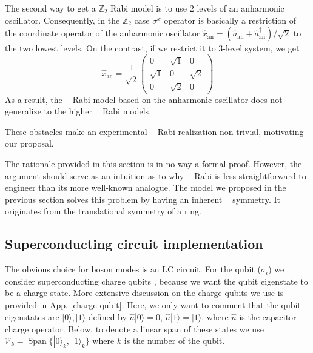 \documentclass[reprint, aps, prx, amsmath, amssymb, longbibliography, superscriptaddress]{revtex4-2}
\DeclareMathOperator{\Zn}{\mathbb{Z}_n}
\DeclareMathOperator{\Zthree}{\mathbb{Z}_3}
\DeclareMathOperator{\Ztwo}{\mathbb{Z}_2}
\begin{document}
The second way to get a $\mathbb{Z}_2$ Rabi model is to use $2$ levels of an anharmonic oscillator. Consequently, in the $\mathbb{Z}_2$ case $\sigma^x$ operator is basically a restriction of the coordinate operator  of the anharmonic oscillator $ \hat x_{\text{an}} = (\hat a_{\text{an}} + \hat a_{\text{an}}^{\dagger})/\sqrt{2} $ to the two lowest levels. On the contrast, if we restrict it to 3-level system, we get
\begin{equation}
    \hat x_{\text{an}} = \frac{1}{\sqrt{2}}\begin{pmatrix} 0 & \sqrt{1} & 0 \\ \sqrt{1} & 0 & \sqrt{2} \\ 0 & \sqrt{2} & 0 \end{pmatrix}
\end{equation}
As a result, the $\Ztwo$ Rabi model based on the anharmonic oscillator does not generalize to the higher $\Zn$ Rabi models.

These obstacles make an experimental $\Zn$‑Rabi realization non‑trivial, motivating our proposal.

The rationale provided in this section is in no way a formal proof. However, the argument should serve as an intuition as to why $\Zthree$ Rabi is less straightforward to engineer than its more well-known analogue. The model we proposed in the previous section solves this problem by having an inherent $\Zthree$ symmetry. It originates from the translational symmetry of a ring.

\subsection{Superconducting circuit implementation}
\label{superconducting-implementation}


The obvious choice for boson modes is an LC circuit. For the qubit ($\sigma_i$)  we consider superconducting charge qubits \cite{bouchiat_quantum_1998,nakamura_coherent_1999,lehnert_measurement_2003,makhlin_quantumstate_2001}, because we want the qubit eigenstate to be a charge state. More extensive discussion on the charge qubits we use is provided in App. \ref{charge-qubit}. Here, we only want to comment that the qubit eigenstates are $|0\rangle, |1\rangle$ defined by $\hat n |0\rangle = 0, \, \hat n |1\rangle = |1\rangle$, where $\hat n$ is the capacitor charge operator. Below, to denote a linear span of these states we use $\mathcal{V}_k = \operatorname{Span}\{|0\rangle_k, \, |1\rangle_k\}$ where $k$ is the number of the qubit.
\end{document}

